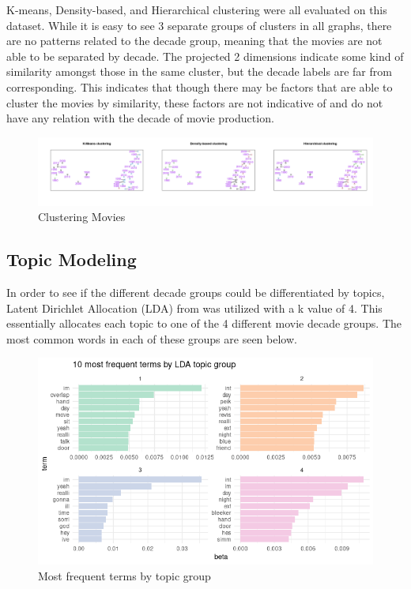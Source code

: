 \documentclass[
  authoryear,
  preprint]{elsarticle}
\begin{document}
K-means, Density-based, and Hierarchical clustering were all evaluated
on this dataset. While it is easy to see 3 separate groups of clusters
in all graphs, there are no patterns related to the decade group,
meaning that the movies are not able to be separated by decade. The
projected 2 dimensions indicate some kind of similarity amongst those in
the same cluster, but the decade labels are far from corresponding. This
indicates that though there may be factors that are able to cluster the
movies by similarity, these factors are not indicative of and do not
have any relation with the decade of movie production.

\begin{figure}[H]

{\centering \includegraphics{images/hier-imageonline.co-merged.png}

}

\caption{Clustering Movies}

\end{figure}%

\subsection{Topic Modeling}\label{topic-modeling}

In order to see if the different decade groups could be differentiated
by topics, Latent Dirichlet Allocation (LDA) from \citet{ldapaper} was
utilized with a k value of 4. This essentially allocates each topic to
one of the 4 different movie decade groups. The most common words in
each of these groups are seen below.

\begin{figure}[H]

{\centering \includegraphics{images/freqLDA.png}

}

\caption{Most frequent terms by topic group}

\end{figure}%
\end{document}
